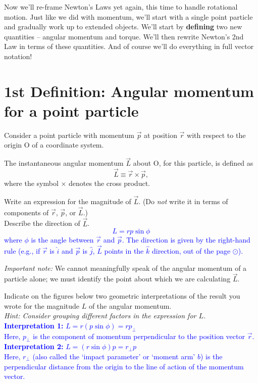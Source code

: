 \documentclass[11pt, letterpaper, openany]{book}
\newenvironment{exercise}[1][Exercise]{%
  \tcolorbox[blanker, breakable, left=1em,
    before skip=1em, after skip=1em,
    borderline west={3pt}{0pt}{PhysNavy},
    colback=PhysCream,
    before upper={\textcolor{PhysNavy}{\sffamily\bfseries #1:}\space}
  ]%
}{%
  \endtcolorbox%
}
\begin{document}
Now we'll re-frame Newton's Laws yet again, this time to handle rotational motion. Just like we did with momentum, we'll start with a single point particle and gradually work up to extended objects. We'll start by \textbf{defining} two new quantities -- angular momentum and torque. We'll then rewrite Newton's 2nd Law in terms of these quantities. And of course we'll do everything in full vector notation!

\section*{1st Definition: Angular momentum for a point particle}

Consider a point particle with momentum $\vec{p}$ at position $\vec{r}$ with respect to the origin O of a coordinate system.

The instantaneous angular momentum $\vec{L}$ about O, for this particle, is defined as
\[ \vec{L} \equiv \vec{r} \times \vec{p}, \]
where the symbol $\times$ denotes the cross product.

\begin{exercise}[Exercise 1]
Write an expression for the magnitude of $\vec{L}$. (Do \textit{not} write it in terms of components of $\vec{r}$, $\vec{p}$, or $\vec{L}$.) \\
Describe the direction of $\vec{L}$. \\
\textcolor{blue}{
\[ L = r p \sin\phi \]
where $\phi$ is the angle between $\vec{r}$ and $\vec{p}$. The direction is given by the right-hand rule (e.g., if $\vec{r}$ is $\hat{i}$ and $\vec{p}$ is $\hat{j}$, $\vec{L}$ points in the $\hat{k}$ direction, out of the page $\odot$).
}
\end{exercise}

\textit{Important note:} We cannot meaningfully speak of the angular momentum of a particle alone; we must identify the point about which we are calculating $\vec{L}$.

\begin{exercise}[Exercise 2]
Indicate on the figures below two geometric interpretations of the result you wrote for the magnitude $L$ of the angular momentum. \\
\textit{Hint: Consider grouping different factors in the expression for $L$.} \\
\textcolor{blue}{
\textbf{Interpretation 1:} $L = r (p \sin\phi) = r p_\perp$ \\
Here, $p_\perp$ is the component of momentum perpendicular to the position vector $\vec{r}$. \\
\textbf{Interpretation 2:} $L = (r \sin\phi) p = r_\perp p$ \\
Here, $r_\perp$ (also called the `impact parameter' or `moment arm' $b$) is the perpendicular distance from the origin to the line of action of the momentum vector.
}
\end{exercise}
\end{document}
